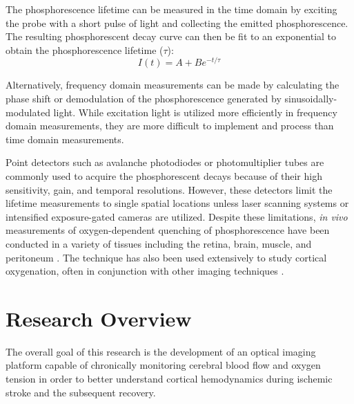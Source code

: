 The phosphorescence lifetime can be measured in the time domain by exciting the probe with a short pulse of light and collecting the emitted phosphorescence. The resulting phosphorescent decay curve can then be fit to an exponential to obtain the phosphorescence lifetime ($\tau$):
%
\begin{equation}
    \label{eq:exponential_decay}
    I(t) = A + Be^{-t / \tau}
\end{equation}

Alternatively, frequency domain measurements can be made by calculating the phase shift or demodulation of the phosphorescence generated by sinusoidally-modulated light. While excitation light is utilized more efficiently in frequency domain measurements, they are more difficult to implement and process than time domain measurements.

Point detectors such as avalanche photodiodes or photomultiplier tubes are commonly used to acquire the phosphorescent decays because of their high sensitivity, gain, and temporal resolutions. However, these detectors limit the lifetime measurements to single spatial locations unless laser scanning systems \cite{Yaseen:2009ep, Kazmi:2013ey} or intensified exposure-gated cameras \cite{Shonat:2003ia, Sakadzic:2009jo} are utilized. Despite these limitations, \textit{in vivo} measurements of oxygen-dependent quenching of phosphorescence have been conducted in a variety of tissues including the retina, brain, muscle, and peritoneum \cite{Vovenko:1999be}. The technique has also been used extensively to study cortical oxygenation, often in conjunction with other imaging techniques \cite{Yu:2013fd, Devor:2014ke}.



\section{Research Overview}

The overall goal of this research is the development of an optical imaging platform capable of chronically monitoring cerebral blood flow and oxygen tension in order to better understand cortical hemodynamics during ischemic stroke and the subsequent recovery.


